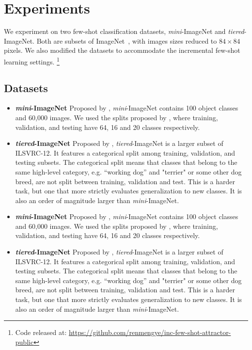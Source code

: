 \section{Experiments}
We experiment on two few-shot classification datasets, \textit{mini}-ImageNet and
\textit{tiered}-ImageNet. Both are subsets of ImageNet~\citep{imagenet}, with images sizes reduced
to $84 \times 84$ pixels. We also modified the datasets to accommodate the
incremental few-shot learning settings.
\footnote{Code released at: \url{https://github.com/renmengye/inc-few-shot-attractor-public}}
\subsection{Datasets}
\iflatexml
\begin{itemize}
\item \textbf{\textit{mini}-ImageNet}
Proposed by \citet{matching}, \textit{mini}-ImageNet
contains 100 object classes and 60,000 images. We used the splits proposed by \citet{metalstm}, where
training, validation, and testing have 64, 16 and 20 classes respectively.
\item \textbf{\textit{tiered}-ImageNet}
Proposed by \citet{fewshotssl}, \textit{tiered}-ImageNet is a
larger subset of ILSVRC-12. It features a categorical split among training, validation, and testing
subsets. The categorical split means that classes that belong to the same high-level category, e.g.
“working dog” and "terrier" or some other dog breed, are not split between training, validation and
test. This is a harder task, but one that more strictly evaluates generalization to new classes. It
is also  an order of magnitude larger than \textit{mini}-ImageNet.
\end{itemize}
\else
\begin{itemize}[leftmargin=*]
\item \textbf{\textit{mini}-ImageNet}
Proposed by \citet{matching}, \textit{mini}-ImageNet
contains 100 object classes and 60,000 images. We used the splits proposed by \citet{metalstm}, where
training, validation, and testing have 64, 16 and 20 classes respectively.
\item \textbf{\textit{tiered}-ImageNet}
Proposed by \citet{fewshotssl}, \textit{tiered}-ImageNet is a
larger subset of ILSVRC-12. It features a categorical split among training, validation, and testing
subsets. The categorical split means that classes that belong to the same high-level category, e.g.
“working dog” and "terrier" or some other dog breed, are not split between training, validation and
test. This is a harder task, but one that more strictly evaluates generalization to new classes. It
is also  an order of magnitude larger than \textit{mini}-ImageNet.
\end{itemize}
\fi

